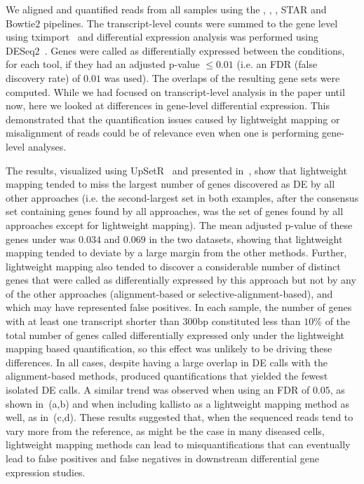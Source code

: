 We aligned and quantified reads from all samples using the \hsa, \saf, \qm, STAR and
Bowtie2 pipelines. The transcript-level counts were summed to the gene level
using tximport~\citep{soneson2015differential} and differential expression analysis was
performed using DESeq2~\citep{love2014moderated}. Genes were called as
differentially expressed between the conditions, for each tool, if they had an adjusted p-value
$\leq 0.01$ (i.e. an FDR (false discovery rate) of $0.01$ was used).  The overlaps of the
resulting gene sets were computed. While we had focused on transcript-level
analysis in the paper until now, here we looked at differences in gene-level
differential expression. This demonstrated that the quantification issues caused
by lightweight mapping or misalignment of reads could be of relevance even when
one is performing gene-level analyses.

The results, visualized using UpSetR~\citep{conway2017upsetr} and presented
  in~, show that lightweight mapping tended to miss the largest number 
  of genes discovered as DE by all other approaches (i.e. the second-largest set in 
  both examples, after the consensus set containing genes found by all approaches, was
  the set of genes found by all approaches except for lightweight mapping). The mean
  adjusted p-value of these genes under \qm was $0.034$ and $0.069$ in the two datasets,
  showing that lightweight mapping tended to deviate by a large margin from the other methods. Further,
  lightweight mapping also tended to discover a considerable number of distinct genes 
  that were called as differentially expressed by this approach but not by any of the other approaches
  (alignment-based or selective-alignment-based), and which may have represented false positives.
  In each sample, the number of genes with at least one transcript shorter than
  $300$bp constituted less than $10\%$ of the total number of genes called
  differentially expressed only under the lightweight mapping based
  quantification, so this effect was unlikely to be driving these differences.
  In all cases, despite having a large overlap
  in DE calls with the alignment-based methods, \hsa produced quantifications that yielded
  the fewest isolated DE calls. A similar trend was observed when using an FDR of $0.05$, as shown in~(a,b)
  and when including kallisto as a lightweight mapping method as well, as in~(c,d). 
  These results suggested that, when
  the sequenced reads tend to vary more from the reference, as might be the case
  in many diseased cells, lightweight mapping methods can lead to
  misquantifications that can eventually lead to false positives and false
  negatives in downstream differential gene expression studies.
 
